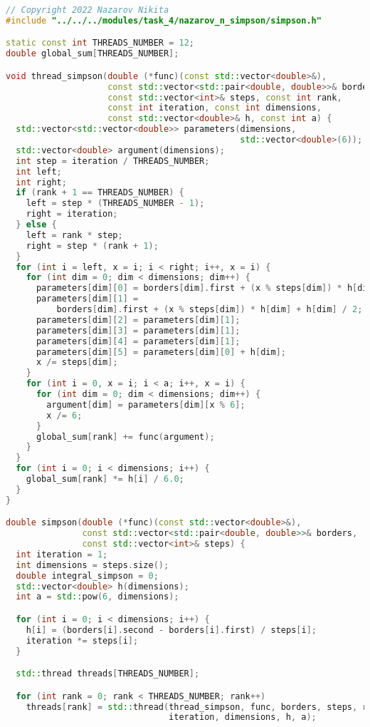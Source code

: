 \documentclass{report}
\begin{document}
\begin{lstlisting}[language=C++]
// Copyright 2022 Nazarov Nikita
#include "../../../modules/task_4/nazarov_n_simpson/simpson.h"

static const int THREADS_NUMBER = 12;
double global_sum[THREADS_NUMBER];

void thread_simpson(double (*func)(const std::vector<double>&),
                    const std::vector<std::pair<double, double>>& borders,
                    const std::vector<int>& steps, const int rank,
                    const int iteration, const int dimensions,
                    const std::vector<double>& h, const int a) {
  std::vector<std::vector<double>> parameters(dimensions,
                                              std::vector<double>(6));
  std::vector<double> argument(dimensions);
  int step = iteration / THREADS_NUMBER;
  int left;
  int right;
  if (rank + 1 == THREADS_NUMBER) {
    left = step * (THREADS_NUMBER - 1);
    right = iteration;
  } else {
    left = rank * step;
    right = step * (rank + 1);
  }
  for (int i = left, x = i; i < right; i++, x = i) {
    for (int dim = 0; dim < dimensions; dim++) {
      parameters[dim][0] = borders[dim].first + (x % steps[dim]) * h[dim];
      parameters[dim][1] =
          borders[dim].first + (x % steps[dim]) * h[dim] + h[dim] / 2;
      parameters[dim][2] = parameters[dim][1];
      parameters[dim][3] = parameters[dim][1];
      parameters[dim][4] = parameters[dim][1];
      parameters[dim][5] = parameters[dim][0] + h[dim];
      x /= steps[dim];
    }
    for (int i = 0, x = i; i < a; i++, x = i) {
      for (int dim = 0; dim < dimensions; dim++) {
        argument[dim] = parameters[dim][x % 6];
        x /= 6;
      }
      global_sum[rank] += func(argument);
    }
  }
  for (int i = 0; i < dimensions; i++) {
    global_sum[rank] *= h[i] / 6.0;
  }
}

double simpson(double (*func)(const std::vector<double>&),
               const std::vector<std::pair<double, double>>& borders,
               const std::vector<int>& steps) {
  int iteration = 1;
  int dimensions = steps.size();
  double integral_simpson = 0;
  std::vector<double> h(dimensions);
  int a = std::pow(6, dimensions);

  for (int i = 0; i < dimensions; i++) {
    h[i] = (borders[i].second - borders[i].first) / steps[i];
    iteration *= steps[i];
  }

  std::thread threads[THREADS_NUMBER];

  for (int rank = 0; rank < THREADS_NUMBER; rank++)
    threads[rank] = std::thread(thread_simpson, func, borders, steps, rank,
                                iteration, dimensions, h, a);


\end{lstlisting}
\end{document}
